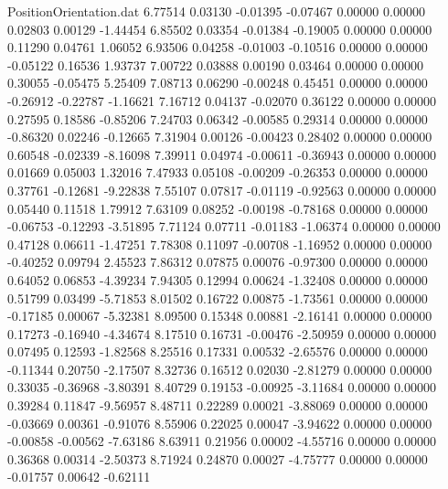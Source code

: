 \begin{filecontents}{PositionOrientation.dat}
   6.77514    0.03130   -0.01395    -0.07467    0.00000    0.00000    0.02803    0.00129   -1.44454
   6.85502    0.03354   -0.01384    -0.19005    0.00000    0.00000    0.11290    0.04761    1.06052
   6.93506    0.04258   -0.01003    -0.10516    0.00000    0.00000   -0.05122    0.16536    1.93737
   7.00722    0.03888    0.00190     0.03464    0.00000    0.00000    0.30055   -0.05475    5.25409
   7.08713    0.06290   -0.00248     0.45451    0.00000    0.00000   -0.26912   -0.22787   -1.16621
   7.16712    0.04137   -0.02070     0.36122    0.00000    0.00000    0.27595    0.18586   -0.85206
   7.24703    0.06342   -0.00585     0.29314    0.00000    0.00000   -0.86320    0.02246   -0.12665
   7.31904    0.00126   -0.00423     0.28402    0.00000    0.00000    0.60548   -0.02339   -8.16098
   7.39911    0.04974   -0.00611    -0.36943    0.00000    0.00000    0.01669    0.05003    1.32016
   7.47933    0.05108   -0.00209    -0.26353    0.00000    0.00000    0.37761   -0.12681   -9.22838
   7.55107    0.07817   -0.01119    -0.92563    0.00000    0.00000    0.05440    0.11518    1.79912
   7.63109    0.08252   -0.00198    -0.78168    0.00000    0.00000   -0.06753   -0.12293   -3.51895
   7.71124    0.07711   -0.01183    -1.06374    0.00000    0.00000    0.47128    0.06611   -1.47251
   7.78308    0.11097   -0.00708    -1.16952    0.00000    0.00000   -0.40252    0.09794    2.45523
   7.86312    0.07875    0.00076    -0.97300    0.00000    0.00000    0.64052    0.06853   -4.39234
   7.94305    0.12994    0.00624    -1.32408    0.00000    0.00000    0.51799    0.03499   -5.71853
   8.01502    0.16722    0.00875    -1.73561    0.00000    0.00000   -0.17185    0.00067   -5.32381
   8.09500    0.15348    0.00881    -2.16141    0.00000    0.00000    0.17273   -0.16940   -4.34674
   8.17510    0.16731   -0.00476    -2.50959    0.00000    0.00000    0.07495    0.12593   -1.82568
   8.25516    0.17331    0.00532    -2.65576    0.00000    0.00000   -0.11344    0.20750   -2.17507
   8.32736    0.16512    0.02030    -2.81279    0.00000    0.00000    0.33035   -0.36968   -3.80391
   8.40729    0.19153   -0.00925    -3.11684    0.00000    0.00000    0.39284    0.11847   -9.56957
   8.48711    0.22289    0.00021    -3.88069    0.00000    0.00000   -0.03669    0.00361   -0.91076
   8.55906    0.22025    0.00047    -3.94622    0.00000    0.00000   -0.00858   -0.00562   -7.63186
   8.63911    0.21956    0.00002    -4.55716    0.00000    0.00000    0.36368    0.00314   -2.50373
   8.71924    0.24870    0.00027    -4.75777    0.00000    0.00000   -0.01757    0.00642   -0.62111

\end{filecontents}
